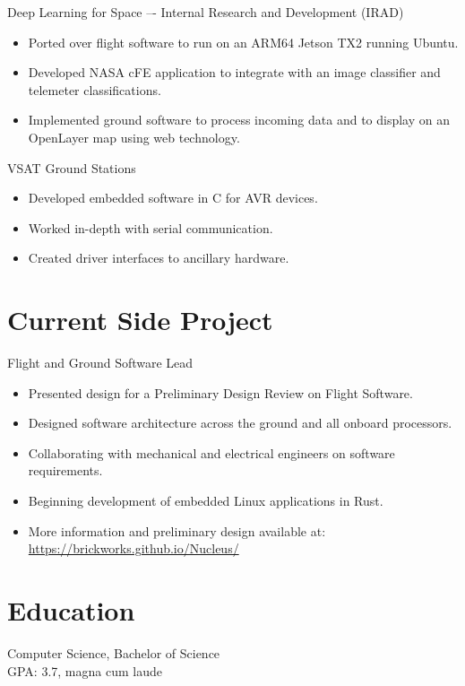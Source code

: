 \documentclass[10pt,final,sans]{resume}
\begin{document}
Deep Learning for Space –- Internal Research and Development (IRAD)
\begin{itemize}
  \item Ported over flight software to run on an ARM64 Jetson TX2 running Ubuntu.
  \item Developed NASA cFE application to integrate with an image classifier and telemeter classifications.
  \item Implemented ground software to process incoming data and to display on an OpenLayer map using web technology.
\end{itemize}
VSAT Ground Stations
\begin{itemize}
  \item Developed embedded software in C for AVR devices.
  \item Worked in-depth with serial communication.
  \item Created driver interfaces to ancillary hardware.
\end{itemize}

\section{Current Side Project}
Flight and Ground Software Lead
\begin{itemize}
  \item Presented design for a Preliminary Design Review on Flight Software.
  \item Designed software architecture across the ground and all onboard processors.
  \item Collaborating with mechanical and electrical engineers on software requirements.
  \item Beginning development of embedded Linux applications in Rust.
  \item More information and preliminary design available at: \href{brickworks.github.io/Nucleus/}{https://brickworks.github.io/Nucleus/}
\end{itemize}

\section{Education}
Computer Science, Bachelor of Science \\
GPA: 3.7, magna cum laude

\end{document}
